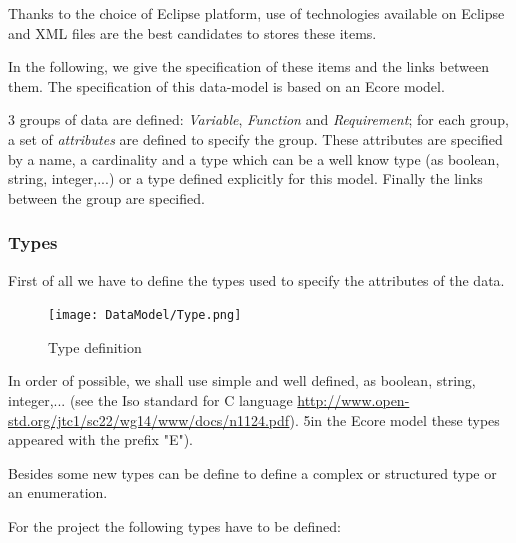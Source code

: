 Thanks to the choice of Eclipse platform, use of technologies available on Eclipse and XML files are the best candidates to stores these items.

In the following, we give the specification of these items and the links between them. The specification of this data-model is based on an Ecore model.

3 groups of data are defined: \emph{Variable}, \emph{Function} and \emph{Requirement}; for each group, a set of \emph{attributes} are defined to specify the group. These attributes are specified by a name, a cardinality and a type which can be a well  know type  (as boolean, string, integer,...) or a type defined explicitly for this model.
Finally the links between the group are specified.

\subsubsection{Types}

First of all we have to define the types used to specify the attributes of the data.

\begin{figure}[ht]
  \centering
  \texttt{[image: DataModel/Type.png]}
  \caption{Type definition}
  \label{fig:Type}
\end{figure}

In order of possible, we shall use simple and well defined, as boolean, string, integer,... (see the Iso standard for C language \url{http://www.open-std.org/jtc1/sc22/wg14/www/docs/n1124.pdf}). 5in the Ecore model these types appeared with the prefix "E").

Besides some new types can be define to define a complex or structured type or an enumeration.

For the project the following types have to be defined:

